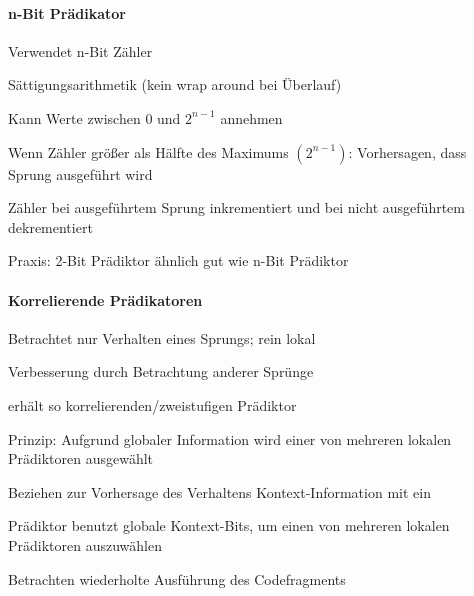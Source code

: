 \documentclass[10pt,landscape]{article}
\begin{document}
\begin{multicols}{3}
  \paragraph{n-Bit Prädikator}
  \begin{itemize*}
    \item Verwendet n-Bit Zähler
    \item Sättigungsarithmetik (kein wrap around bei Überlauf)
    \item Kann Werte zwischen $0$ und $2^{n-1}$ annehmen
    \item Wenn Zähler größer als Hälfte des Maximums $(2^{n-1})$: Vorhersagen, dass Sprung ausgeführt wird
    \item Zähler bei ausgeführtem Sprung inkrementiert und bei nicht ausgeführtem dekrementiert
    \item Praxis: 2-Bit Prädiktor ähnlich gut wie n-Bit Prädiktor
  \end{itemize*}
  
  \paragraph{Korrelierende Prädikatoren}
  \begin{itemize*}
    \item Betrachtet nur Verhalten eines Sprungs; rein lokal
    \item Verbesserung durch Betrachtung anderer Sprünge
    \item erhält so korrelierenden/zweistufigen Prädiktor
    \item Prinzip: Aufgrund globaler Information wird einer von mehreren lokalen Prädiktoren ausgewählt
    \item Beziehen zur Vorhersage des Verhaltens Kontext-Information mit ein
    \item Prädiktor benutzt globale Kontext-Bits, um einen von mehreren lokalen Prädiktoren auszuwählen
    \item Betrachten wiederholte Ausführung des Codefragments
  \end{itemize*}
  

\end{multicols}
\end{document}
